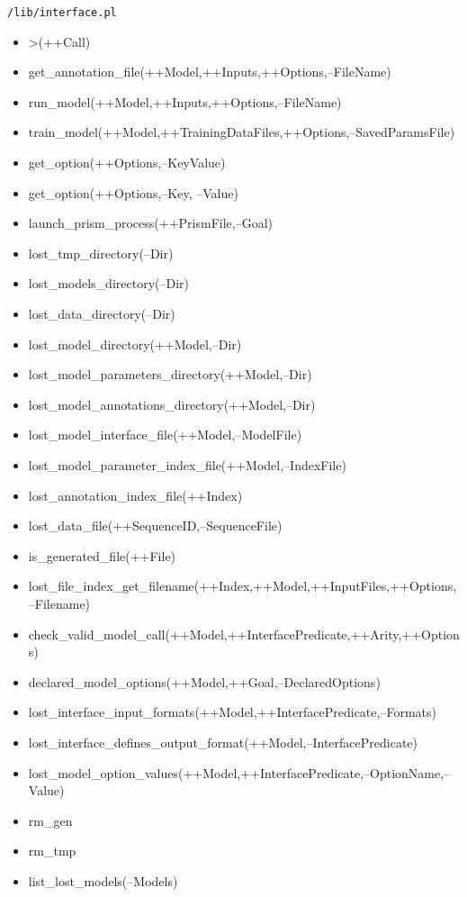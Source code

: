 \texttt{/lib/interface.pl} \\
%
\begin{itemize}
\item >(++Call)
\item get\_annotation\_file(++Model,++Inputs,++Options,--FileName)
\item run\_model(++Model,++Inputs,++Options,--FileName)
\item train\_model(++Model,++TrainingDataFiles,++Options,--SavedParamsFile)
\item get\_option(++Options,--KeyValue)
\item get\_option(++Options,--Key, --Value)
\item launch\_prism\_process(++PrismFile,--Goal)
\item lost\_tmp\_directory(--Dir)
\item lost\_models\_directory(--Dir)
\item lost\_data\_directory(--Dir)
\item lost\_model\_directory(++Model,--Dir)
\item lost\_model\_parameters\_directory(++Model,--Dir)
\item lost\_model\_annotations\_directory(++Model,--Dir) %
\item lost\_model\_interface\_file(++Model,--ModelFile)
\item lost\_model\_parameter\_index\_file(++Model,--IndexFile)
\item lost\_annotation\_index\_file(++Index)
\item lost\_data\_file(++SequenceID,--SequenceFile)
\item is\_generated\_file(++File)
\item lost\_file\_index\_get\_filename(++Index,++Model,++InputFiles,++Options,--Filename)
\item check\_valid\_model\_call(++Model,++InterfacePredicate,++Arity,++Options)
\item declared\_model\_options(++Model,++Goal,--DeclaredOptions)
\item lost\_interface\_input\_formats(++Model,++InterfacePredicate,--Formats)
\item lost\_interface\_defines\_output\_format(++Model,--InterfacePredicate)
\item lost\_model\_option\_values(++Model,++InterfacePredicate,--OptionName,--Value)  
\item rm\_gen
\item rm\_tmp
\item list\_lost\_models(--Models) 
\end{itemize}




